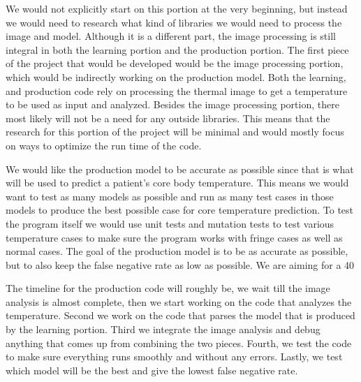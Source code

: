 \documentclass[onecolumn, draftclsnofoot,10pt, compsoc]{IEEEtran}
\begin{document}
We would not explicitly start on this portion at the very beginning, but instead we would need to research what kind of libraries we would need to process the image and model. Although it is a different part, the image processing is still integral in both the learning portion and the production portion. The first piece of the project that would be developed would be the image processing portion, which would be indirectly working on the production model. Both the learning, and production code rely on processing the thermal image to get a temperature to be used as input and analyzed. Besides the image processing portion, there most likely will not be a need for any outside libraries. This means that the research for this portion of the project will be minimal and would mostly focus on ways to optimize the run time of the code.

We would like the production model to be accurate as possible since that is what will be used to predict a patient's core body temperature. This means we would want to test as many models as possible and run as many test cases in those models to produce the best possible case for core temperature prediction. To test the program itself we would use unit tests and mutation tests to test various temperature cases to make sure the program works with fringe cases as well as normal cases. The goal of the production model is to be as accurate as possible, but to also keep the false negative rate as low as possible. We are aiming for a 40%

The timeline for the production code will roughly be, we wait till the image analysis is almost complete, then we start working on the code that analyzes the temperature. Second we work on the code that parses the model that is produced by the learning portion. Third we integrate the image analysis and debug anything that comes up from combining the two pieces. Fourth, we test the code to make sure everything runs smoothly and without any errors. Lastly, we test which model will be the best and give the lowest false negative rate.
\end{document}
